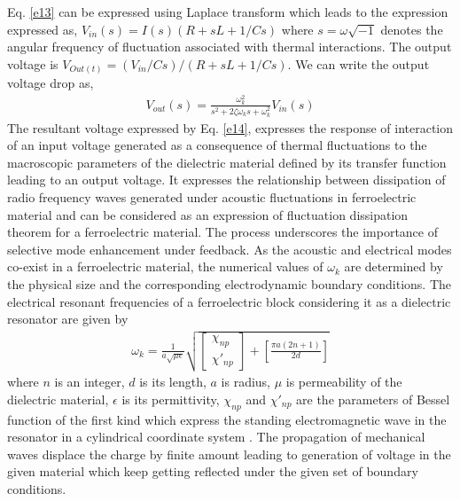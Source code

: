 \documentclass[12pt,column,showpacs,pre,preprintnumbers,amsmath,amssymb,aps,standalone]{revtex4-2}
\begin{document}
Eq. \ref{e13} can be expressed using Laplace transform which leads to the expression expressed as, $ V_{in}(s)=I(s)(R+sL+1/Cs) $ where $ s=\omega\sqrt{-1} $ denotes the angular frequency of fluctuation associated with thermal interactions. The output voltage is $ V_{Out(t)}=(V_{in}/Cs)/(R+sL+1/Cs) $. We can write the output voltage drop as,
\begin{align} \label{e14}
V_{out}(s)=\frac{\omega_k^2}{s^2+2\zeta \omega_ks+\omega_k^2}V_{in}(s)  
\end{align} 
The resultant voltage expressed by Eq. \ref{e14}, expresses the response of
interaction of an input voltage generated as a consequence of thermal
fluctuations to the macroscopic parameters of the dielectric material defined
by its transfer function leading to an output voltage. It expresses the relationship between dissipation of radio frequency waves generated under acoustic fluctuations in ferroelectric material and can be considered as an expression of fluctuation dissipation theorem for a ferroelectric material. The process underscores the importance of selective mode enhancement under feedback.
As the acoustic and electrical modes co-exist in a ferroelectric material, the numerical values of $\omega_k$ are determined by the physical size and the corresponding electrodynamic boundary conditions.  The electrical resonant frequencies of a ferroelectric block considering it as a dielectric resonator are given by \cite{23}
\begin{align} \label{e15}
\omega_k=\frac{1}{a\sqrt{\mu \epsilon}}\sqrt{\left[\begin{array}{c}\chi_{np} \\ \chi'_{np}\end{array}\right]+\left[\frac{\pi a(2n+1)}{2d}\right]}
\end{align}
where $n$ is an integer, $d$ is its length, $a$ is radius, $\mu$ is permeability of the dielectric material, $\epsilon$ is its permittivity, $\chi_{np}$ and $\chi'_{np}$ are the parameters of Bessel function of the first kind which express the standing electromagnetic wave in the resonator in a cylindrical coordinate system \cite{24}. The propagation of mechanical waves displace the charge by finite amount leading to generation of voltage in the given material which keep getting reflected under the given set of boundary conditions. 
\end{document}
